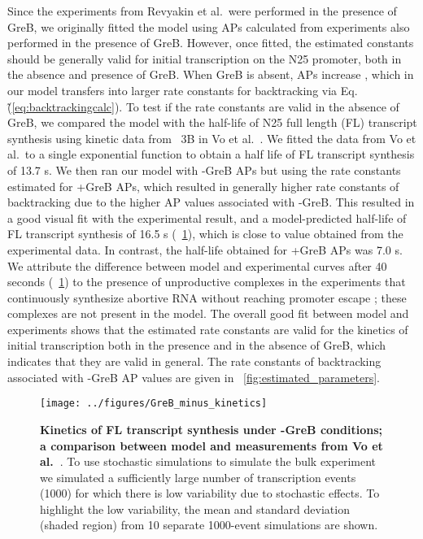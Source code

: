 Since the experiments from Revyakin et al.\ were performed in the presence of
GreB, we originally fitted the model using APs calculated from experiments
also performed in the presence of GreB. However, once fitted, the estimated
constants should be generally valid for initial transcription on the N25
promoter, both in the absence and presence of GreB. When GreB is absent, APs
increase \cite{hsu_initial_2006}, which in our model transfers into larger
rate constants for backtracking via Eq.\~(\ref{eq:backtrackingcalc}). To test
if the rate constants are valid in the absence of GreB, we compared the model
with the half-life of N25 full length (FL) transcript synthesis using kinetic
data from \FIG~3B in Vo et al.\ \cite{vo_vitro_2003-1}.  We fitted the data
from Vo et al.\ to a single exponential function to obtain a half life of FL
transcript synthesis of 13.7 s. We then ran our model with -GreB APs but using
the rate constants estimated for +GreB APs, which resulted in generally
higher rate constants of backtracking due to the higher AP values associated
with -GreB. This resulted in a good visual fit with the experimental result,
and a model-predicted half-life of FL transcript synthesis of 16.5 s
(\FIG~\ref{fig:vo_comparison}), which is close to value obtained from the
experimental data. In contrast, the half-life obtained for +GreB APs was 7.0
s. We attribute the difference between model and experimental curves after 40
seconds (\FIG~\ref{fig:vo_comparison}) to the presence of unproductive
complexes in the experiments that continuously synthesize abortive RNA without
reaching promoter escape \cite{vo_vitro_2003-1}; these complexes are not
present in the model. The overall good fit between model and experiments shows
that the estimated rate constants are valid for the kinetics of initial
transcription both in the presence and in the absence of GreB, which indicates
that they are valid in general. The rate constants of backtracking associated
with -GreB AP values are given in \FIG~\ref{fig:estimated_parameters}.

\begin{figure}[h]
    \begin{center}
        \texttt{[image: ../figures/GreB\_minus\_kinetics]}
    \end{center}
    \caption{ {\bf Kinetics of FL transcript synthesis under -GreB conditions;
        a comparison between model and measurements from Vo
      et al.~\cite{vo_vitro_2003-1}}. To use stochastic simulations to
      simulate the bulk experiment we simulated a sufficiently large number of
      transcription events (1000) for which there is low variability due to
      stochastic effects. To highlight the low variability, the mean and
      standard deviation (shaded region) from 10 separate 1000-event
      simulations are shown.}
\label{fig:vo_comparison}
\end{figure}

